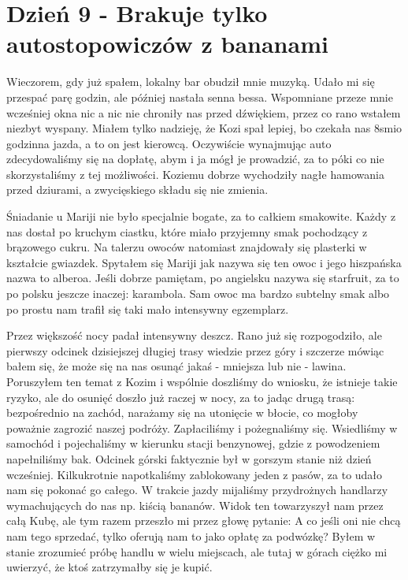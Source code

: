 
\chapter[Brakuje tylko autostopowiczów z bananami]{Dzień 9 - Brakuje tylko autostopowiczów z bananami}

Wieczorem, gdy już spałem, lokalny bar obudził mnie muzyką.
Udało mi się przespać parę godzin, ale później nastała senna bessa.
Wspomniane przeze mnie wcześniej okna nic a nic nie chroniły nas przed dźwiękiem, przez co rano wstałem niezbyt wyspany.
Miałem tylko nadzieję, że Kozi spał lepiej, bo czekała nas 8smio godzinna jazda, a to on jest kierowcą.
Oczywiście wynajmując auto zdecydowaliśmy się na dopłatę, abym i ja mógł je prowadzić, za to póki co nie skorzystaliśmy z tej możliwości.
Koziemu dobrze wychodziły nagłe hamowania przed dziurami, a zwycięskiego składu się nie zmienia.
\par Śniadanie u Mariji nie było specjalnie bogate, za to całkiem smakowite.
Każdy z nas dostał po kruchym ciastku, które miało przyjemny smak pochodzący z brązowego cukru.
Na talerzu owoców natomiast znajdowały się plasterki w kształcie gwiazdek.
Spytałem się Mariji jak nazywa się ten owoc i jego hiszpańska nazwa to alberoa.
Jeśli dobrze pamiętam, po angielsku nazywa się starfruit, za to po polsku jeszcze inaczej: karambola. Sam owoc ma bardzo subtelny smak albo po prostu nam trafił się taki mało intensywny egzemplarz.
\par Przez większość nocy padał intensywny deszcz.
Rano już się rozpogodziło, ale pierwszy odcinek dzisiejszej długiej trasy wiedzie przez góry i szczerze mówiąc bałem się, że może się na nas osunąć jakaś - mniejsza lub nie - lawina.
Poruszyłem ten temat z Kozim i wspólnie doszliśmy do wniosku, że istnieje takie ryzyko, ale do osunięć doszło już raczej w nocy, za to jadąc drugą trasą: bezpośrednio na zachód, narażamy się na utonięcie w błocie, co mogłoby poważnie zagrozić naszej podróży.
Zapłaciliśmy i pożegnaliśmy się.
Wsiedliśmy w samochód i pojechaliśmy w kierunku stacji benzynowej, gdzie z powodzeniem napełniliśmy bak.
Odcinek górski faktycznie był w gorszym stanie niż dzień wcześniej.
Kilkukrotnie napotkaliśmy zablokowany jeden z pasów, za to udało nam się pokonać go całego.
W trakcie jazdy mijaliśmy przydrożnych handlarzy wymachujących do nas np.
kiścią bananów.
Widok ten towarzyszył nam przez całą Kubę, ale tym razem przeszło mi przez głowę pytanie: A co jeśli oni nie chcą nam tego sprzedać, tylko oferują nam to jako opłatę za podwózkę?
Byłem w stanie zrozumieć próbę handlu w wielu miejscach, ale tutaj w górach ciężko mi uwierzyć, że ktoś zatrzymałby się je kupić.
